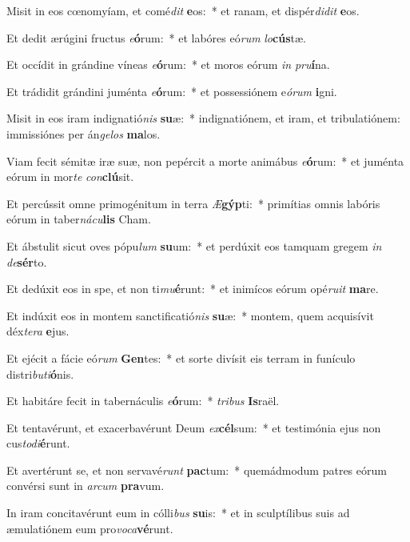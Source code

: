 \item Misit in eos cœnomyíam, et comé\textit{dit} \textbf{e}os:~* et ranam, et dispér\textit{di}\textit{dit} \textbf{e}os.
\item Et dedit ærúgini fructus \textit{e}\textbf{ó}rum:~* et labóres eó\textit{rum} \textit{lo}\textbf{cús}tæ.
\item Et occídit in grándine víneas \textit{e}\textbf{ó}rum:~* et moros eórum \textit{in} \textit{pru}\textbf{í}na.
\item Et trádidit grándini juménta \textit{e}\textbf{ó}rum:~* et possessiónem e\textit{ó}\textit{rum} \textbf{i}gni.
\item Misit in eos iram indignatió\textit{nis} \textbf{su}æ:~* indignatiónem, et iram, et tribulatiónem: immissiónes per án\textit{ge}\textit{los} \textbf{ma}los.
\item Viam fecit sémitæ iræ suæ, non pepércit a morte animábus \textit{e}\textbf{ó}rum:~* et juménta eórum in mor\textit{te} \textit{con}\textbf{clú}sit.
\item Et percússit omne primogénitum in terra \textit{Æ}\textbf{gýp}ti:~* primítias omnis labóris eórum in taber\textit{ná}\textit{cu}\textbf{lis} Cham.
\item Et ábstulit sicut oves pópu\textit{lum} \textbf{su}um:~* et perdúxit eos tamquam gregem \textit{in} \textit{de}\textbf{sér}to.
\item Et dedúxit eos in spe, et non ti\textit{mu}\textbf{é}runt:~* et inimícos eórum opé\textit{ru}\textit{it} \textbf{ma}re.
\item Et indúxit eos in montem sanctificatió\textit{nis} \textbf{su}æ:~* montem, quem acquisívit déx\textit{te}\textit{ra} \textbf{e}jus.
\item Et ejécit a fácie eó\textit{rum} \textbf{Gen}tes:~* et sorte divísit eis terram in funículo distri\textit{bu}\textit{ti}\textbf{ó}nis.
\item Et habitáre fecit in tabernáculis \textit{e}\textbf{ó}rum:~* \textit{tri}\textit{bus} \textbf{Is}raël.
\item Et tentavérunt, et exacerbavérunt Deum \textit{ex}\textbf{cél}sum:~* et testimónia ejus non cus\textit{to}\textit{di}\textbf{é}runt.
\item Et avertérunt se, et non servavé\textit{runt} \textbf{pac}tum:~* quemádmodum patres eórum convérsi sunt in \textit{ar}\textit{cum} \textbf{pra}vum.
\item In iram concitavérunt eum in cólli\textit{bus} \textbf{su}is:~* et in sculptílibus suis ad æmulatiónem eum pro\textit{vo}\textit{ca}\textbf{vé}runt.
